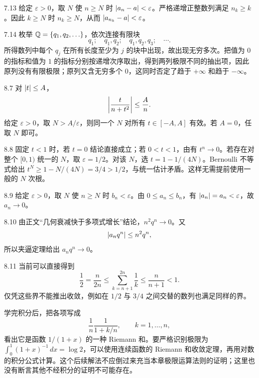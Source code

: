 \begin{solution}{7.13}
给定 \(\varepsilon>0\)，取 \(N\) 使 \(n\ge N\) 时
\(\left|a_n-a\right|<\varepsilon\)。严格递增正整数列满足 \(n_k\ge k\)。因此 \(k\ge N\) 时 \(n_k\ge N\)，从而
\(\left|a_{n_k}-a\right|<\varepsilon\)。
\end{solution}

\begin{solution}{7.14}
枚举 \(\mathbb{Q}=\{q_1,q_2,\ldots\}\)，依次连接有限块
\[
 q_1;\quad q_1,q_2;\quad q_1,q_2,q_3;\quad\cdots.
\]
所得数列中每个 \(q_j\) 在所有长度至少为 \(j\) 的块中出现，故出现无穷多次。把值为 \(0\) 的指标和值为 \(1\) 的指标分别按递增次序取出，得到两列极限不同的抽出项，因此原列没有有限极限；原列又含无穷多个 \(0\)，这同时否定了趋于 \(+\infty\) 和趋于 \(-\infty\)。
\end{solution}

\begin{solution}{8.7}
对 \(\left|t\right|\le A\)，
\[
 \left|\frac{t}{n+t^2}\right|\le\frac A n.
\]
给定 \(\varepsilon>0\)，取 \(N>A/\varepsilon\)，则同一个 \(N\) 对所有 \(t\in[-A,A]\) 有效。若 \(A=0\)，任取 \(N\) 即可。
\end{solution}

\begin{solution}{8.8}
固定 \(t<1\) 时，若 \(t=0\) 结论直接成立；若 \(0<t<1\)，由有 \(t^n\to0\)。若存在对整个 \([0,1)\) 统一的 \(N\)，取 \(\varepsilon=1/2\)。对该 \(N\)，选 \(t=1-1/(4N)\)。Bernoulli 不等式给出 \(t^N\ge1-N/(4N)=3/4>1/2\)，与统一估计矛盾。这样无需提前使用一般的 \(N\) 次根。
\end{solution}

\begin{solution}{8.9}
给定 \(\varepsilon>0\)，取 \(N\) 使 \(n\ge N\) 时 \(b_n<\varepsilon\)。由
\(0\le a_n\le b_n\)，有
\(\left|a_n\right|=a_n<\varepsilon\)，故 \(a_n\to0\)。
\end{solution}

\begin{solution}{8.10}
由正文“几何衰减快于多项式增长”结论，\(n^2q^n\to0\)。又
\[
 \left|a_nq^n\right|\le n^2q^n,
\]
所以夹逼定理给出 \(a_nq^n\to0\)。
\end{solution}

\begin{solution}{8.11}
当前可以直接得到
\[
 \frac12=\frac n{2n}
 \le\sum_{k=n+1}^{2n}\frac1k
 \le\frac n{n+1}<1.
\]
仅凭这些界不能推出收敛，例如在 \(1/2\) 与 \(3/4\) 之间交替的数列也满足同样的界。

学完积分后，把各项写成
\[
 \frac1n\frac1{1+k/n},\qquad k=1,\ldots,n,
\]
看出它是函数 \(1/(1+x)\) 的一种 Riemann 和。要严格识别极限为
\(\int_0^1(1+x)^{-1}\,dx=\log2\)，可以使用连续函数的 Riemann 和收敛定理，再用对数的积分公式计算。这个后续解法不应倒过来充当本章极限运算法则的证明；这里也没有断言其他不经积分的证明不可能存在。
\end{solution}

